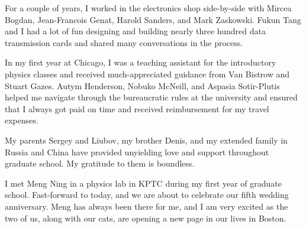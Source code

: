 For a couple of years, I worked in the electronics shop side-by-side with Mircea Bogdan, Jean-Francois Genat, Harold Sanders, and Mark Zaskowski. Fukun Tang and I had a lot of fun designing and building nearly three hundred data transmission cards and shared many conversations in the process.

In my first year at Chicago, I was a teaching assistant for the introductory physics classes and received much-appreciated guidance from Van Bistrow and Stuart Gazes. Autym Henderson, Nobuko McNeill, and Aspasia Sotir-Plutis helped me navigate through the bureaucratic rules at the university and ensured that I always got paid on time and received reimbursement for my travel expenses.

My parents Sergey and Liubov, my brother Denis, and my extended family in Russia and China have provided unyielding love and support throughout graduate school. My gratitude to them is boundless.

I met Meng Ning in a physics lab in KPTC during my first year of graduate school. Fast-forward to today, and we are about to celebrate our fifth wedding anniversary. Meng has always been there for me, and I am very excited as the two of us, along with our cats, are opening a new page in our lives in Boston.
